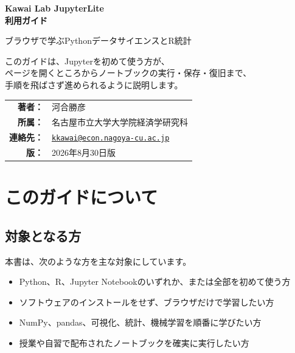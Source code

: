 \documentclass[a4paper,11pt]{ltjsarticle}
\begin{document}
\hypersetup{pageanchor=false}

\begin{titlepage}
  \thispagestyle{empty}
  \centering
  \vspace*{24mm}
  {\sffamily\bfseries\color{GuideBlue}\fontsize{26}{34}\selectfont
    Kawai Lab JupyterLite\\[3mm]
    利用ガイド\par}
  \vspace{8mm}
  {\Large ブラウザで学ぶPythonデータサイエンスとR統計\par}
  \vspace{20mm}

  \begin{tcolorbox}[
    width=0.84\textwidth,
    colback=GuideLightBlue,
    colframe=GuideBlue,
    boxrule=0.8pt,
    arc=3pt
  ]
    \centering
    このガイドは、Jupyterを初めて使う方が、\\
    ページを開くところからノートブックの実行・保存・復旧まで、\\
    手順を飛ばさず進められるように説明します。
  \end{tcolorbox}

  \vfill
  \begin{tabular}{rl}
    \textbf{著者：} & 河合勝彦\\[2mm]
    \textbf{所属：} & 名古屋市立大学大学院経済学研究科\\[2mm]
    \textbf{連絡先：} & \href{mailto:kkawai@econ.nagoya-cu.ac.jp}
      {\nolinkurl{kkawai@econ.nagoya-cu.ac.jp}}\\[2mm]
    \textbf{版：} & 2026年8月30日版
  \end{tabular}
  \vspace{18mm}
\end{titlepage}

\hypersetup{pageanchor=true}
\tableofcontents
\clearpage
{}

\section{このガイドについて}

\subsection{対象となる方}

本書は、次のような方を主な対象にしています。

\begin{itemize}
  \item Python、R、Jupyter Notebookのいずれか、または全部を初めて使う方
  \item ソフトウェアのインストールをせず、ブラウザだけで学習したい方
  \item NumPy、pandas、可視化、統計、機械学習を順番に学びたい方
  \item 授業や自習で配布されたノートブックを確実に実行したい方
\end{itemize}
\end{document}
